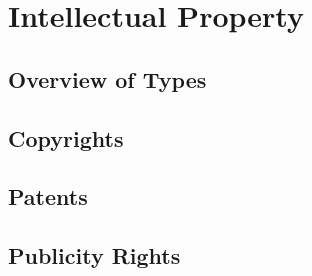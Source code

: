 \chapter{Intellectual Property}



\section{Overview of Types}




\section{Copyrights}



\begin{questions}

\end{questions}


\section{Patents}





\begin{questions}

\end{questions}


\section{Publicity Rights}





\begin{questions}

\end{questions}



